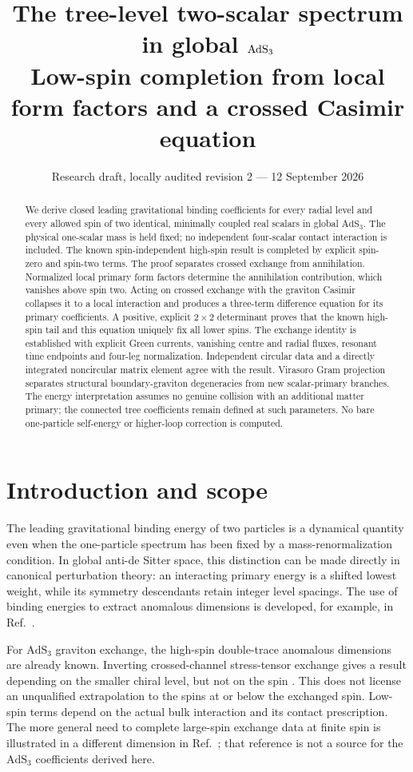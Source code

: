 \documentclass[11pt,a4paper]{article}
\title{The tree-level two-scalar spectrum in global $\AdS_3$\\[5pt]
\large Low-spin completion from local form factors and a crossed Casimir equation}
\author{}
\date{Research draft, locally audited revision 2 --- 12 September 2026}
\numberwithin{equation}{section}
\theoremstyle{remark}\newtheorem{remark}[theorem]{Remark}
\newcommand{\AdS}{\mathrm{AdS}}
\begin{document}
\maketitle
\vspace{-15pt}
\begin{abstract}
We derive closed leading gravitational binding coefficients for every radial level and every allowed spin of two identical, minimally coupled real scalars in global $\AdS_3$. The physical one-scalar mass is held fixed; no independent four-scalar contact interaction is included. The known spin-independent high-spin result is completed by explicit spin-zero and spin-two terms. The proof separates crossed exchange from annihilation. Normalized local primary form factors determine the annihilation contribution, which vanishes above spin two. Acting on crossed exchange with the graviton Casimir collapses it to a local interaction and produces a three-term difference equation for its primary coefficients. A positive, explicit $2\times2$ determinant proves that the known high-spin tail and this equation uniquely fix all lower spins. The exchange identity is established with explicit Green currents, vanishing centre and radial fluxes, resonant time endpoints and four-leg normalization. Independent circular data and a directly integrated noncircular matrix element agree with the result. Virasoro Gram projection separates structural boundary-graviton degeneracies from new scalar-primary branches. The energy interpretation assumes no genuine collision with an additional matter primary; the connected tree coefficients remain defined at such parameters. No bare one-particle self-energy or higher-loop correction is computed.
\end{abstract}

\section{Introduction and scope}

The leading gravitational binding energy of two particles is a dynamical quantity even when the one-particle spectrum has been fixed by a mass-renormalization condition. In global anti-de Sitter space, this distinction can be made directly in canonical perturbation theory: an interacting primary energy is a shifted lowest weight, while its symmetry descendants retain integer level spacings. The use of binding energies to extract anomalous dimensions is developed, for example, in Ref.~\cite{FS}.

For $\AdS_3$ graviton exchange, the high-spin double-trace anomalous dimensions are already known. Inverting crossed-channel stress-tensor exchange gives a result depending on the smaller chiral level, but not on the spin \cite{KSS,CH}. This does not license an unqualified extrapolation to the spins at or below the exchanged spin. Low-spin terms depend on the actual bulk interaction and its contact prescription. The more general need to complete large-spin exchange data at finite spin is illustrated in a different dimension in Ref.~\cite{ABP}; that reference is not a source for the $\AdS_3$ coefficients derived here.
\end{document}
